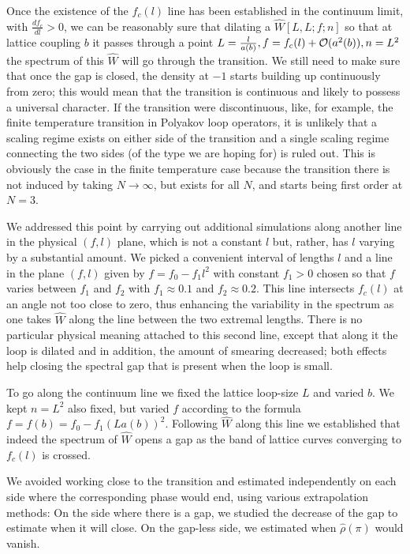 Once the existence of the $f_c (l)$ line has been established in
the continuum limit, with $\frac{df_c}{dl} > 0$, we can be
reasonably sure that dilating a $\hat W [L,L;f;n]$ so that at
lattice coupling $b$ it passes through a point $L=\frac{l}{a(b)},
f=f_c (l)+{\cal O}(a^2(b)), n=L^2$ the spectrum of this $\hat W$
will go through the transition. We still need to make sure that
once the gap is closed, the density at $-1$ starts building up
continuously from zero; this would mean that the transition is
continuous and likely to possess a universal character. If the
transition were discontinuous, like, for example, the finite
temperature transition in Polyakov loop operators, it is unlikely
that a scaling regime exists on either side of the transition and
a single scaling regime connecting the two sides (of the type we
are hoping for) is ruled out. This is obviously the case in the
finite temperature case because the transition there is not
induced by taking $N\to\infty$, but exists for all $N$, and starts
being first order at $N=3$.


We addressed this point by carrying out additional simulations
along another line in the physical $(f,l)$ plane, which is not a
constant $l$ but, rather, has $l$ varying by a substantial amount.
We picked a convenient interval of lengths $l$ and a line in the
plane $(f,l)$ given by $f=f_0-f_1 l^2$ with constant $f_1 >0$
chosen so that $f$ varies between $f_1$ and $f_2$ with $f_1\approx
0.1$ and $f_2\approx 0.2$. This line intersects $f_c (l)$ at an
angle not too close to zero, thus enhancing the variability in the
spectrum as one takes $\hat W$ along the line between the two
extremal lengths. There is no particular physical meaning attached
to this second line, except that along it the loop is dilated and
in addition, the amount of smearing decreased; both effects help
closing the spectral gap that is present when the loop is small.

To go along the continuum line we fixed the lattice loop-size $L$
and varied $b$. We kept $n=L^2$ also fixed, but
varied $f$ according to the formula $f=f(b)=f_0-f_1 (La(b))^2$.
Following $\hat W$
along this line we established that indeed the spectrum of $\hat
W$ opens a gap as the band of lattice curves
converging to $f_c(l)$ is crossed.

We avoided working close to the transition and estimated
independently on each side where the corresponding phase would
end, using various extrapolation methods: On the side where there
is a gap, we studied the decrease of the gap to estimate when it
will close. On the gap-less side, we estimated when $\hat \rho
(\pi)$ would vanish.


